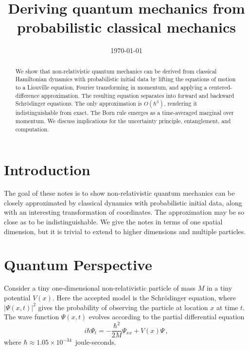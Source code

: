 \documentclass[prb,preprint]{revtex4-1}
\begin{document}
\title{Deriving quantum mechanics from probabilistic classical mechanics}


\date{\today}

\begin{abstract}
We show that non-relativistic quantum mechanics can be derived from classical
Hamiltonian dynamics with probabilistic initial data by lifting the equations of motion
to a Liouville equation, Fourier transforming in momentum, and applying a centered-difference
approximation.  The resulting equation separates into forward and backward
Schr\"odinger equations.  The only approximation is $O(\hbar^3)$, rendering it
indistinguishable from exact.  The Born rule emerges as a time-averaged marginal
over momentum.  We discuss implications for the uncertainty principle, entanglement,
and computation.
\end{abstract}

\maketitle


\section{Introduction}

The goal of these notes is to show non-relativistic quantum mechanics can be closely
approximated by classical dynamics with probabilistic initial data, along with an interesting
transformation of coordinates.  The approximation may be so close as to be indistinguishable.
We give the notes in terms of one spatial dimension, but it is trivial to extend to higher
dimensions and multiple particles.


\section{Quantum Perspective}

Consider a tiny one-dimensional non-relativistic particle of mass $M$ in a tiny potential $V(x)$.
Here the accepted model is the Schr\"odinger equation, where $|\Psi(x,t)|^2$ gives the probability
of observing the particle at location $x$ at time $t$.  The wave function $\Psi(x,t)$
evolves according to the partial differential equation
\begin{equation}\label{eq:schrodinger}
i\hbar \Psi_t = -\frac{\hbar^2}{2M}\Psi_{xx} + V(x)\Psi \,,
\end{equation}
where $\hbar \approx 1.05 \times 10^{-34}$~joule-seconds.
\end{document}
